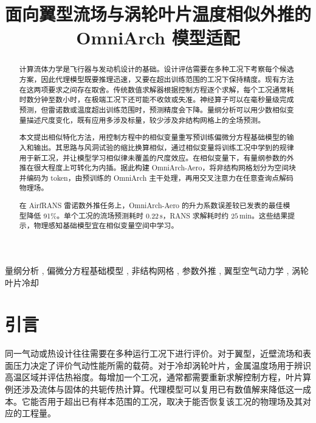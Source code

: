 \documentclass[a4paper,fleqn]{cas-sc}
\newcommand{\sectionbudget}[2][初稿可供审阅]{%
  \noindent{\small\textbf{版面预算}\enspace 约 #2 页\quad
    \textbf{状态}\enspace #1}\par\nobreak
}
\begin{document}
\let\WriteBookmarks\relax
\def\floatpagepagefraction{1}
\def\textpagefraction{.001}

\shorttitle{}
\shortauthors{}
\title[mode=title]{面向翼型流场与涡轮叶片温度相似外推的 OmniArch 模型适配}


\begin{abstract}
计算流体力学是飞行器与发动机设计的基础。设计评估需要在多种工况下考察每个候选方案，因此代理模型既要推理迅速，又要在超出训练范围的工况下保持精度。现有方法在这两项要求之间存在取舍。传统数值求解器根据控制方程逐个求解，每个工况通常耗时数分钟至数小时，在极端工况下还可能不收敛或失准。神经算子可以在毫秒量级完成预测，但雷诺数或温度超出训练范围时，预测精度会下降。量纲分析可以用少数相似变量描述尺度变化，既有应用多涉及标量，较少涉及非结构网格上的全场预测。

本文提出相似特化方法，用控制方程中的相似变量重写预训练偏微分方程基础模型的输入和输出。其思路与风洞试验的缩比换算相似，通过相似变量将训练工况中学到的规律用于新工况，并让模型学习相似律未覆盖的尺度效应。在相似变量下，有量纲参数的外推在很大程度上可转化为内插。据此构建 OmniArch-Aero，将非结构网格划分为空间块并编码为 token，由预训练的 OmniArch 主干处理，再用交叉注意力在任意查询点解码物理场。

在 AirfRANS 雷诺数外推任务上，OmniArch-Aero 的升力系数误差较已发表的最佳模型降低 91\%。单个工况的流场预测耗时 \(0.22\,\mathrm{s}\)，RANS 求解耗时约 \(25\,\mathrm{min}\)。这些结果提示，物理感知基础模型宜在相似变量空间中学习。
\end{abstract}

\begin{keywords}[关键词]
量纲分析 \sep
偏微分方程基础模型 \sep
非结构网格 \sep
参数外推 \sep
翼型空气动力学 \sep
涡轮叶片冷却
\end{keywords}

\maketitle

\section{引言}\label{sec:introduction}
\sectionbudget{2}

同一气动或热设计往往需要在多种运行工况下进行评价。对于翼型，近壁流场和表面压力决定了评价气动性能所需的载荷。对于冷却涡轮叶片，金属温度场用于辨识高温区域并评估热裕度\citep{Han2013}。每增加一个工况，通常都需要重新求解控制方程，叶片算例还涉及流体与固体的共轭传热计算。代理模型可以复用已有数值解来降低这一成本\citep{Brunton2020,Benner2015}。它能否用于超出已有样本范围的工况，取决于能否恢复该工况的物理场及其对应的工程量。
\end{document}
